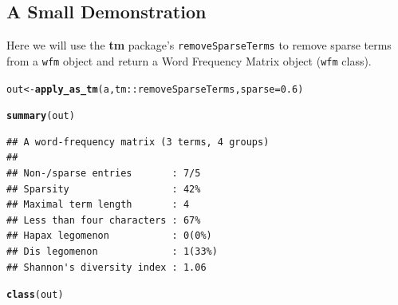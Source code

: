 \documentclass{article}\usepackage[]{graphicx}\usepackage[]{color}
\makeatletter
\newcommand{\hlnum}[1]{\textcolor[rgb]{0.686,0.059,0.569}{#1}}%
\newcommand{\hlstd}[1]{\textcolor[rgb]{0.345,0.345,0.345}{#1}}%
\newcommand{\hlkwb}[1]{\textcolor[rgb]{0.69,0.353,0.396}{#1}}%
\newcommand{\hlkwc}[1]{\textcolor[rgb]{0.333,0.667,0.333}{#1}}%
\newcommand{\hlkwd}[1]{\textcolor[rgb]{0.737,0.353,0.396}{\textbf{#1}}}%
\newenvironment{kframe}{%
 \def\at@end@of@kframe{}%
 \ifinner\ifhmode%
  \def\at@end@of@kframe{\end{minipage}}%
  \begin{minipage}{\columnwidth}%
 \fi\fi%
 \def\FrameCommand##1{\hskip\@totalleftmargin \hskip-\fboxsep
 \colorbox{shadecolor}{##1}\hskip-\fboxsep
     \hskip-\linewidth \hskip-\@totalleftmargin \hskip\columnwidth}%
 \MakeFramed {\advance\hsize-\width
   \@totalleftmargin\z@ \linewidth\hsize
   \@setminipage}}%
 {\par\unskip\endMakeFramed%
 \at@end@of@kframe}
\newenvironment{knitrout}{}{} %
\makeatother
\begin{document}
\subsection{A Small Demonstration}

\hspace{.4cm} Here we will use the \textbf{tm} package's \texttt{removeSparseTerms} to remove sparse terms from a \texttt{wfm} object and return a Word Frequency Matrix object (\texttt{wfm} class).

\begin{knitrout}
\color{fgcolor}\begin{kframe}
\begin{alltt}
\hlstd{out} \hlkwb{<-} \hlkwd{apply_as_tm}\hlstd{(a, tm::removeSparseTerms,} \hlkwc{sparse}\hlstd{=}\hlnum{0.6}\hlstd{)}
\end{alltt}
\end{kframe}
\end{knitrout}


\begin{knitrout}
\color{fgcolor}\begin{kframe}
\begin{alltt}
\hlkwd{summary}\hlstd{(out)}
\end{alltt}
\end{kframe}
\end{knitrout}


\begin{knitrout}
\color{fgcolor}\begin{kframe}
\begin{verbatim}
## A word-frequency matrix (3 terms, 4 groups)
## 
## Non-/sparse entries       : 7/5
## Sparsity                  : 42%
## Maximal term length       : 4
## Less than four characters : 67%
## Hapax legomenon           : 0(0%)
## Dis legomenon             : 1(33%)
## Shannon's diversity index : 1.06
\end{verbatim}
\end{kframe}
\end{knitrout}


\begin{knitrout}
\color{fgcolor}\begin{kframe}
\begin{alltt}
\hlkwd{class}\hlstd{(out)}
\end{alltt}
\end{kframe}
\end{knitrout}
\end{document}
